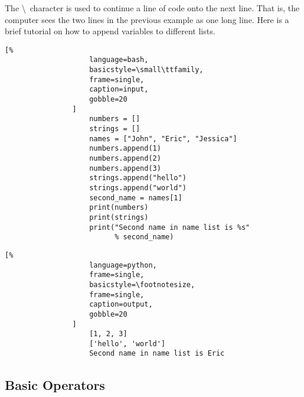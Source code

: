 \documentclass[crop=false,class=book]{standalone}
\begin{document}
            The \textbackslash\ character is used to continue a line
            of code onto the next line. That is, the computer sees
            the two lines in the previous example as one long line.
            Here is a brief tutorial on how to append variables to
            different lists.\newline
            \begin{minipage}[t]{.48\textwidth}
                \centering
                \begin{lstlisting}[%
                    language=bash,
                    basicstyle=\small\ttfamily,
                    frame=single,
                    caption=input,
                    gobble=20
                ]
                    numbers = []
                    strings = []
                    names = ["John", "Eric", "Jessica"]
                    numbers.append(1)
                    numbers.append(2)
                    numbers.append(3)
                    strings.append("hello")
                    strings.append("world")
                    second_name = names[1]
                    print(numbers)
                    print(strings)
                    print("Second name in name list is %s"
                          % second_name)
                \end{lstlisting}
            \end{minipage}\hfill
            \begin{minipage}[t]{.48\textwidth}
                \centering
                \begin{lstlisting}[%
                    language=python,
                    frame=single,
                    basicstyle=\footnotesize,
                    frame=single,
                    caption=output,
                    gobble=20
                ]
                    [1, 2, 3]
                    ['hello', 'world']
                    Second name in name list is Eric
                \end{lstlisting}
            \end{minipage}
            \newpage
        \subsection{Basic Operators}
\end{document}

